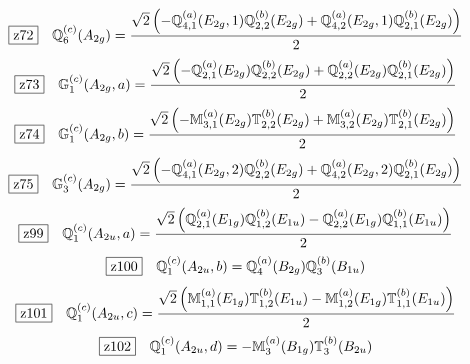 \documentclass[fleqn,10pt,landscape]{jsarticle}
\begin{document}
\begin{dmath*}
\hspace*{3mm}\fbox{z72}\quad \mathbb{Q}_{6}^{(c)}(A_{2g})=\frac{\sqrt{2} \left(- \mathbb{Q}_{4,1}^{(a)}(E_{2g},1) \mathbb{Q}_{2,2}^{(b)}(E_{2g}) + \mathbb{Q}_{4,2}^{(a)}(E_{2g},1) \mathbb{Q}_{2,1}^{(b)}(E_{2g})\right)}{2}
\end{dmath*}
\begin{dmath*}
\hspace*{3mm}\fbox{z73}\quad \mathbb{G}_{1}^{(c)}(A_{2g},a)=\frac{\sqrt{2} \left(- \mathbb{Q}_{2,1}^{(a)}(E_{2g}) \mathbb{Q}_{2,2}^{(b)}(E_{2g}) + \mathbb{Q}_{2,2}^{(a)}(E_{2g}) \mathbb{Q}_{2,1}^{(b)}(E_{2g})\right)}{2}
\end{dmath*}
\begin{dmath*}
\hspace*{3mm}\fbox{z74}\quad \mathbb{G}_{1}^{(c)}(A_{2g},b)=\frac{\sqrt{2} \left(- \mathbb{M}_{3,1}^{(a)}(E_{2g}) \mathbb{T}_{2,2}^{(b)}(E_{2g}) + \mathbb{M}_{3,2}^{(a)}(E_{2g}) \mathbb{T}_{2,1}^{(b)}(E_{2g})\right)}{2}
\end{dmath*}
\begin{dmath*}
\hspace*{3mm}\fbox{z75}\quad \mathbb{G}_{3}^{(c)}(A_{2g})=\frac{\sqrt{2} \left(- \mathbb{Q}_{4,1}^{(a)}(E_{2g},2) \mathbb{Q}_{2,2}^{(b)}(E_{2g}) + \mathbb{Q}_{4,2}^{(a)}(E_{2g},2) \mathbb{Q}_{2,1}^{(b)}(E_{2g})\right)}{2}
\end{dmath*}
\begin{dmath*}
\hspace*{3mm}\fbox{z99}\quad \mathbb{Q}_{1}^{(c)}(A_{2u},a)=\frac{\sqrt{2} \left(\mathbb{Q}_{2,1}^{(a)}(E_{1g}) \mathbb{Q}_{1,2}^{(b)}(E_{1u}) - \mathbb{Q}_{2,2}^{(a)}(E_{1g}) \mathbb{Q}_{1,1}^{(b)}(E_{1u})\right)}{2}
\end{dmath*}
\begin{dmath*}
\hspace*{3mm}\fbox{z100}\quad \mathbb{Q}_{1}^{(c)}(A_{2u},b)=\mathbb{Q}_{4}^{(a)}(B_{2g}) \mathbb{Q}_{3}^{(b)}(B_{1u})
\end{dmath*}
\begin{dmath*}
\hspace*{3mm}\fbox{z101}\quad \mathbb{Q}_{1}^{(c)}(A_{2u},c)=\frac{\sqrt{2} \left(\mathbb{M}_{1,1}^{(a)}(E_{1g}) \mathbb{T}_{1,2}^{(b)}(E_{1u}) - \mathbb{M}_{1,2}^{(a)}(E_{1g}) \mathbb{T}_{1,1}^{(b)}(E_{1u})\right)}{2}
\end{dmath*}
\begin{dmath*}
\hspace*{3mm}\fbox{z102}\quad \mathbb{Q}_{1}^{(c)}(A_{2u},d)=- \mathbb{M}_{3}^{(a)}(B_{1g}) \mathbb{T}_{3}^{(b)}(B_{2u})
\end{dmath*}
\end{document}
